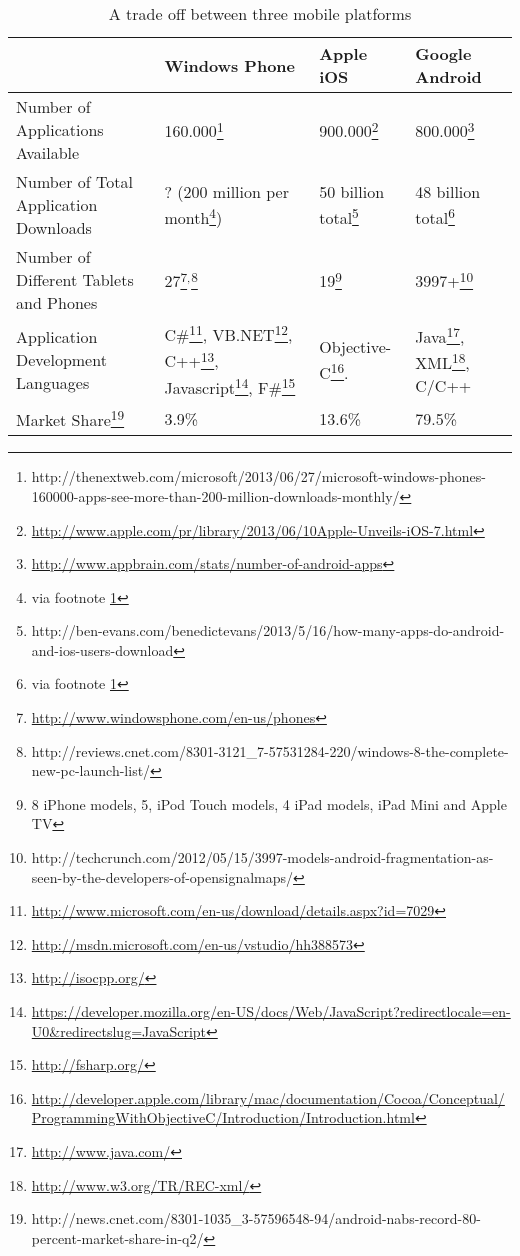 \begin{savenotes}
\begin{table}[h]
\begin{center}
\caption{A trade off between three mobile platforms \label{tab:trade_off_mob}}
	\begin{tabularx}{\textwidth}{| X|X|X|X |}
	\hline
	& Windows Phone & Apple iOS & Google Android\\ \hline
	
	Number of Applications Available 
	& 160.000\footnote{http://thenextweb.com/microsoft/2013/06/27/microsoft-windows-phones-160000-apps-see-more-than-200-million-downloads-monthly/\label{downloads}} 
	& 900.000\footnote{\url{http://www.apple.com/pr/library/2013/06/10Apple-Unveils-iOS-7.html}} 	
	& 800.000\footnote{\url{http://www.appbrain.com/stats/number-of-android-apps}} \\ \hline
	
	Number of Total Application Downloads 
	& ? (200 million per month\footnote{via footnote \ref{downloads}}) 
	& 50 billion total\footnote{\label{note1}http://ben-evans.com/benedictevans/2013/5/16/how-many-apps-do-android-and-ios-users-download}
	& 48 billion total\footnote{via footnote \ref{note1}} \\ \hline 

	Number of Different Tablets and Phones 
	& 27\footnote{\url{http://www.windowsphone.com/en-us/phones}}$^{,}$\footnote{http://reviews.cnet.com/8301-3121\_7-57531284-220/windows-8-the-complete-new-pc-launch-list/}
	& 19\footnote{8 iPhone models, 5, iPod Touch models, 4 iPad models, iPad Mini and Apple TV}
	& 3997+\footnote{http://techcrunch.com/2012/05/15/3997-models-android-fragmentation-as-seen-by-the-developers-of-opensignalmaps/} \\ \hline
	
	Application Development Languages 
	& C\#\footnote{\url{http://www.microsoft.com/en-us/download/details.aspx?id=7029}}, VB.NET\footnote{\url{http://msdn.microsoft.com/en-us/vstudio/hh388573}}, C++\footnote{\url{http://isocpp.org/}}, Javascript\footnote{\url{https://developer.mozilla.org/en-US/docs/Web/JavaScript?redirectlocale=en-U0\&redirectslug=JavaScript}}, F\#\footnote{\url{http://fsharp.org/}} 
	& Objective-C\footnote{\url{http://developer.apple.com/library/mac/documentation/Cocoa/Conceptual/ProgrammingWithObjectiveC/Introduction/Introduction.html}}.
	& Java\footnote{\url{http://www.java.com/}}, XML\footnote{\url{http://www.w3.org/TR/REC-xml/}}, C/C++ \\ \hline
	
	Market Share\footnote{http://news.cnet.com/8301-1035\_3-57596548-94/android-nabs-record-80-percent-market-share-in-q2/}		& 3.9\% & 13.6\% & 79.5\% \\ \hline

	\end{tabularx}
\end{center}
\end{table}
\end{savenotes}